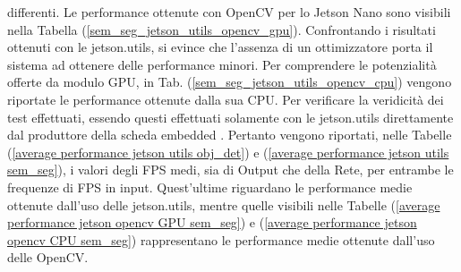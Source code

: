 differenti. Le performance ottenute con OpenCV per lo Jetson Nano sono 
visibili nella Tabella (\ref{sem_seg_jetson_utils_opencv_gpu}). Confrontando i 
risultati ottenuti con le jetson.utils, si evince che l'assenza di un 
ottimizzatore porta il sistema ad ottenere delle performance minori. 
Per comprendere le potenzialità offerte da modulo GPU, in Tab. 
(\ref{sem_seg_jetson_utils_opencv_cpu}) vengono riportate le performance 
ottenute dalla sua CPU. Per verificare la veridicità dei test effettuati, 
essendo questi effettuati solamente con le jetson.utils direttamente dal 
produttore della scheda embedded \cite{performance_obj_det_jetson}. Pertanto vengono 
riportati, nelle Tabelle (\ref{average performance jetson utils obj_det}) e (\ref{average performance jetson utils sem_seg}),  
i valori degli FPS medi, sia di Output che della Rete, per entrambe le 
frequenze di FPS in input. Quest'ultime riguardano le performance medie ottenute dall'uso delle jetson.utils, 
mentre quelle visibili nelle Tabelle (\ref{average performance jetson opencv GPU sem_seg}) e (\ref{average performance jetson opencv CPU sem_seg}) rappresentano le performance medie 
ottenute dall'uso delle OpenCV.
